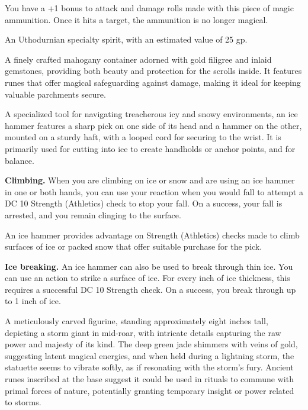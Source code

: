 \documentclass[
  letterpaper,12pt,twoside,twocolumn,openany,
  nodeprecatedcode,bg=full]{dndbook}
\begin{document}
You have a +1 bonus to attack and damage rolls made with this piece of
magic ammunition. Once it hits a target, the ammunition is no longer
magical.


An Uthodurnian specialty spirit, with an estimated value of 25 gp.


A finely crafted mahogany container adorned with gold filigree and
inlaid gemstones, providing both beauty and protection for the scrolls
inside. It features runes that offer magical safeguarding against
damage, making it ideal for keeping valuable parchments secure.


A specialized tool for navigating treacherous icy and snowy
environments, an ice hammer features a sharp pick on one side of its
head and a hammer on the other, mounted on a sturdy haft, with a looped
cord for securing to the wrist. It is primarily used for cutting into
ice to create handholds or anchor points, and for balance.

\textbf{Climbing.} When you are climbing on ice or snow and are using an
ice hammer in one or both hands, you can use your reaction when you
would fall to attempt a DC 10 Strength (Athletics) check to stop your
fall. On a success, your fall is arrested, and you remain clinging to
the surface.

An ice hammer provides advantage on Strength (Athletics) checks made to
climb surfaces of ice or packed snow that offer suitable purchase for
the pick.

\textbf{Ice breaking.} An ice hammer can also be used to break through
thin ice. You can use an action to strike a surface of ice. For every
inch of ice thickness, this requires a successful DC 10 Strength check.
On a success, you break through up to 1 inch of ice.


A meticulously carved figurine, standing approximately eight inches
tall, depicting a storm giant in mid-roar, with intricate details
capturing the raw power and majesty of its kind. The deep green jade
shimmers with veins of gold, suggesting latent magical energies, and
when held during a lightning storm, the statuette seems to vibrate
softly, as if resonating with the storm's fury. Ancient runes inscribed
at the base suggest it could be used in rituals to commune with primal
forces of nature, potentially granting temporary insight or power
related to storms.
\end{document}
